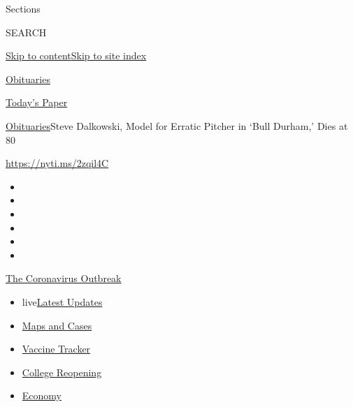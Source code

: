 Sections

SEARCH

\protect\hyperlink{site-content}{Skip to
content}\protect\hyperlink{site-index}{Skip to site index}

\href{https://www.nytimes3xbfgragh.onion/section/obituaries}{Obituaries}

\href{https://myaccount.nytimes3xbfgragh.onion/auth/login?response_type=cookie\&client_id=vi}{}

\href{https://www.nytimes3xbfgragh.onion/section/todayspaper}{Today's
Paper}

\href{/section/obituaries}{Obituaries}\textbar{}Steve Dalkowski, Model
for Erratic Pitcher in `Bull Durham,' Dies at 80

\url{https://nyti.ms/2zqil4C}

\begin{itemize}
\item
\item
\item
\item
\item
\item
\end{itemize}

\href{https://www.nytimes3xbfgragh.onion/news-event/coronavirus?action=click\&pgtype=Article\&state=default\&region=TOP_BANNER\&context=storylines_menu}{The
Coronavirus Outbreak}

\begin{itemize}
\tightlist
\item
  live\href{https://www.nytimes3xbfgragh.onion/2020/08/04/world/coronavirus-covid-19.html?action=click\&pgtype=Article\&state=default\&region=TOP_BANNER\&context=storylines_menu}{Latest
  Updates}
\item
  \href{https://www.nytimes3xbfgragh.onion/interactive/2020/us/coronavirus-us-cases.html?action=click\&pgtype=Article\&state=default\&region=TOP_BANNER\&context=storylines_menu}{Maps
  and Cases}
\item
  \href{https://www.nytimes3xbfgragh.onion/interactive/2020/science/coronavirus-vaccine-tracker.html?action=click\&pgtype=Article\&state=default\&region=TOP_BANNER\&context=storylines_menu}{Vaccine
  Tracker}
\item
  \href{https://www.nytimes3xbfgragh.onion/2020/08/02/us/covid-college-reopening.html?action=click\&pgtype=Article\&state=default\&region=TOP_BANNER\&context=storylines_menu}{College
  Reopening}
\item
  \href{https://www.nytimes3xbfgragh.onion/live/2020/08/03/business/stock-market-today-coronavirus?action=click\&pgtype=Article\&state=default\&region=TOP_BANNER\&context=storylines_menu}{Economy}
\end{itemize}


